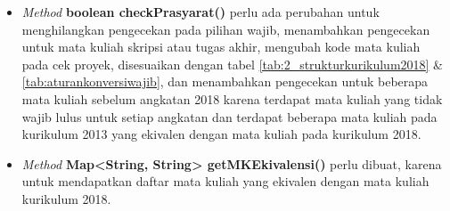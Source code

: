 \begin{enumerate}
\begin{itemize}
		\item \textit{Method} \textbf{boolean checkPrasyarat()} perlu ada perubahan untuk menghilangkan pengecekan pada pilihan wajib, menambahkan pengecekan untuk mata kuliah skripsi atau tugas akhir, mengubah kode mata kuliah pada cek proyek, disesuaikan dengan tabel \ref{tab:2_strukturkurikulum2018} \& \ref{tab:aturankonversiwajib}, dan menambahkan pengecekan untuk beberapa mata kuliah sebelum angkatan 2018 karena terdapat mata kuliah yang tidak wajib lulus untuk setiap angkatan dan terdapat beberapa mata kuliah pada kurikulum 2013 yang ekivalen dengan mata kuliah pada kurikulum 2018.
		\item \textit{Method} \textbf{Map<String, String> getMKEkivalensi()} perlu dibuat, karena untuk mendapatkan daftar mata kuliah yang ekivalen dengan mata kuliah kurikulum 2018.
	\end{itemize}
		

\end{enumerate}
